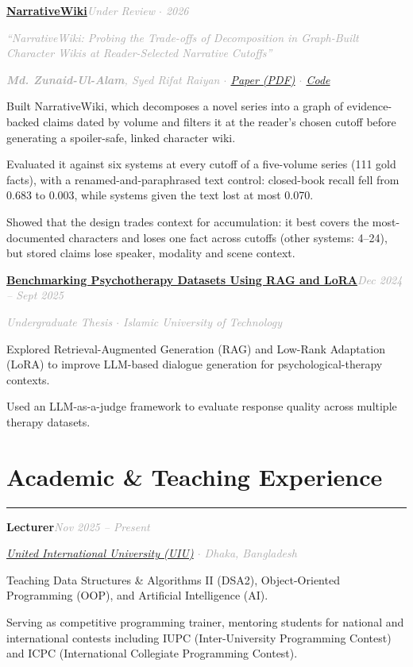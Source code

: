 \documentclass[10pt]{article}
\newcommand{\sectionrule}{\vspace{-2pt}\noindent\textcolor{rulegray}{\rule{\linewidth}{1pt}}\vspace{6pt}}
\newcommand{\cvsection}[1]{%
  \Needspace{6\baselineskip}%
  \section{#1}\sectionrule%
}
\newcommand{\cvitem}[2]{%
  \Needspace{4\baselineskip}%
  \par\vspace{6pt}\noindent\textbf{#1}\hfill\textit{\textcolor{darkgray}{#2}}\par\vspace{1pt}%
}
\newcommand{\cvsub}[1]{\textit{\textcolor{darkgray}{#1}}\par\vspace{2pt}}
\begin{document}
\cvitem{\href{https://zunaid13.github.io/Portfolio/assets/narrativewiki-paper.pdf}{NarrativeWiki}}{Under Review $\cdot$ 2026}
\cvsub{``NarrativeWiki: Probing the Trade-offs of Decomposition in Graph-Built Character Wikis at Reader-Selected Narrative \mbox{Cutoffs}''}
\cvsub{\textbf{Md. Zunaid-Ul-Alam}, Syed Rifat Raiyan $\cdot$ \href{https://zunaid13.github.io/Portfolio/assets/narrativewiki-paper.pdf}{Paper (PDF)} $\cdot$ \href{https://github.com/zunaid13/narrativewiki}{Code}}
\begin{cvitemize}
  \item Built NarrativeWiki, which decomposes a novel series into a graph of evidence-backed claims dated by volume and filters it at the reader's chosen cutoff before generating a spoiler-safe, linked character wiki.
  \item Evaluated it against six systems at every cutoff of a five-volume series (111 gold facts), with a renamed-and-paraphrased text control: closed-book recall fell from 0.683 to 0.003, while systems given the text lost at most 0.070.
  \item Showed that the design trades context for accumulation: it best covers the most-documented characters and loses one fact across cutoffs (other systems: 4--24), but stored claims lose speaker, modality and scene context.
\end{cvitemize}

\cvitem{\href{https://github.com/zunaid13/Thesis-Chat-Counsellor/tree/main}{Benchmarking Psychotherapy Datasets Using RAG and LoRA}}{Dec 2024 -- Sept 2025}
\cvsub{Undergraduate Thesis $\cdot$ Islamic University of Technology}
\begin{cvitemize}
  \item Explored Retrieval-Augmented Generation (RAG) and Low-Rank Adaptation (LoRA) to improve LLM-based dialogue generation for psychological-therapy contexts.
  \item Used an LLM-as-a-judge framework to evaluate response quality across multiple therapy datasets.
\end{cvitemize}

\cvsection{Academic \& Teaching Experience}

\cvitem{Lecturer}{Nov 2025 -- Present}
\cvsub{\href{https://www.uiu.ac.bd/}{United International University (UIU)} $\cdot$ Dhaka, Bangladesh}
\begin{cvitemize}
  \item Teaching Data Structures \& Algorithms II (DSA2), Object-Oriented Programming (OOP), and Artificial Intelligence (AI).
  \item Serving as competitive programming trainer, mentoring students for national and international contests including IUPC (Inter-University Programming Contest) and ICPC (International Collegiate Programming Contest).
\end{cvitemize}
\end{document}
